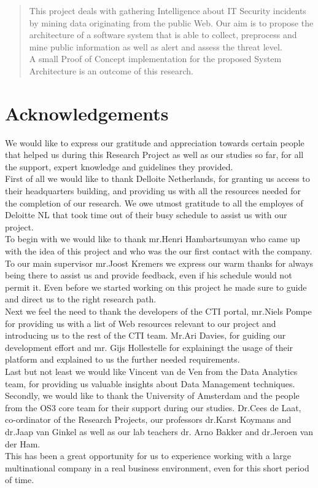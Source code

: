 \documentclass[12pt]{article}
\begin{document}
\newpage
\begin{abstract}
\noindent
This project deals with gathering Intelligence about IT Security incidents by mining data originating from the public Web. Our aim is to propose the architecture of a software system that is able to collect, preprocess and mine public information as well as alert and assess the threat level. \\
A small Proof of Concept implementation for the proposed System Architecture is an outcome of this research. 
\end{abstract}
\newpage
\section*{Acknowledgements}

We would like to express our gratitude and appreciation towards certain people that helped us during this Research Project as well as our studies so far, for all the support, expert knowledge and guidelines they provided. 
\hfill \break \\ 
First of all we would like to thank Delloite Netherlands, for granting us access to their headquarters building, and providing us with all the resources needed for the completion of our research. We owe utmost gratitude to all the employes of Deloitte NL that took time out of their busy schedule to assist us with our project. 
\\ 
To begin with we would like to thank mr.Henri Hambartsumyan who came up with the idea of this project and who was the our first contact with the company. \\
To our main supervisor mr.Joost Kremers we express our warm thanks for always being there to assist us and provide feedback, even if his schedule would not permit it. Even before we started working on this project he made sure to guide and direct us to the right research path.\\
Next we feel the need to thank the developers of the CTI portal, mr.Niels Pompe for providing us with a list of Web resources relevant to our project and introducing us to the rest of the CTI team. Mr.Ari Davies, for guiding our development effort and mr. Gijs Hollestelle for explainingt the usage of their platform and explained to us the further needed requirements.\\
Last but not least we would like Vincent van de Ven from the Data Analytics team, for providing us valuable insights about Data Management techniques. 
\hfill \break \\ 
Secondly, we would like to thank the University of Amsterdam and the people from the OS3 core team for their support during our studies. Dr.Cees de Laat, co-ordinator of the Research Projects, our professors dr.Karst Koymans and dr.Jaap van Ginkel as well as our lab teachers dr. Arno Bakker and dr.Jeroen van der Ham. 
\hfill \break \\ 
This has been a great opportunity for us to experience working with a large multinational company in a real business environment, even for this short period of time.
\end{document}
